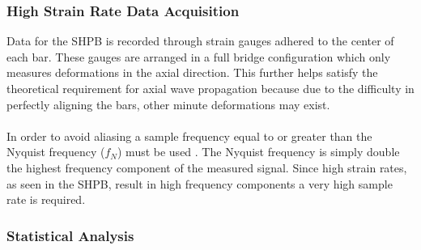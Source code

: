 \documentclass[12pt]{article}
\begin{document}
\subsubsection{High Strain Rate Data Acquisition} %
Data for the SHPB is recorded through strain gauges adhered to the center of each bar. These gauges are arranged in a full bridge configuration which only measures deformations in the axial direction. This further helps satisfy the theoretical requirement for axial wave propagation because due to the difficulty in perfectly aligning the bars, other minute deformations may exist.
\\ \\
In order to avoid aliasing a sample frequency equal to or greater than the Nyquist frequency ($f_N$) must be used \cite{Sampling}. The Nyquist frequency is simply double the highest frequency component of the measured signal. Since high strain rates, as seen in the SHPB, result in high frequency components a very high sample rate is required. 

\subsubsection{Statistical Analysis} %
\end{document}
